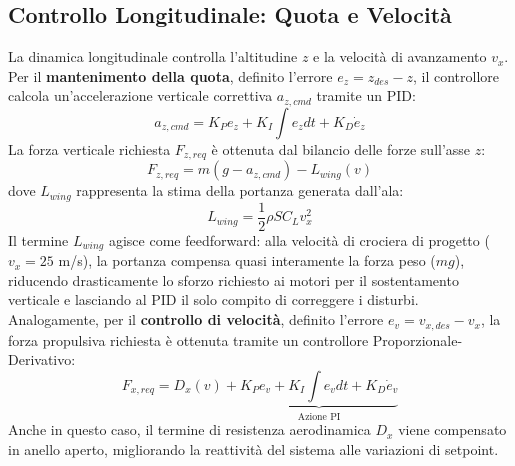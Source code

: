 \subsection{Controllo Longitudinale: Quota e Velocità}
La dinamica longitudinale controlla l'altitudine $z$ e la velocità di avanzamento $v_x$.
\\Per il \textbf{mantenimento della quota}, definito l'errore $e_z = z_{des} - z$, il controllore calcola un'accelerazione verticale correttiva $a_{z,cmd}$ tramite un PID:
\begin{equation}
        a_{z,cmd} = K_P e_z + K_I \int e_z dt + K_D \dot{e}_z
\end{equation} 
La forza verticale richiesta $F_{z,req}$ è ottenuta dal bilancio delle forze sull'asse $z$:
\begin{equation}
    F_{z,req} = m (g - a_{z,cmd}) - L_{wing}(v)
    \label{eq:fz_req}
\end{equation}
dove $L_{wing}$ rappresenta la stima della portanza generata dall'ala:
\begin{equation}
    L_{wing} = \frac{1}{2}\rho S C_L v_x^2
\end{equation}
Il termine $L_{wing}$ agisce come feedforward: alla velocità di crociera di progetto ($v_x = 25$ m/s), la portanza compensa quasi interamente la forza peso ($mg$), riducendo drasticamente lo sforzo richiesto ai motori per il sostentamento verticale e lasciando al PID il solo compito di correggere i disturbi.
\\Analogamente, per il \textbf{controllo di velocità}, definito l'errore $e_v = v_{x,des} - v_x$, la forza propulsiva richiesta è ottenuta tramite un controllore Proporzionale-Derivativo:
    \begin{equation}
        F_{x,req} = D_{x}(v) + \underbrace{K_P e_v + K_I \int e_v dt + K_D \dot{e}_v}_{\text{Azione PI}}
        \label{eq:fx}
    \end{equation}
Anche in questo caso, il termine di resistenza aerodinamica $D_{x}$ viene compensato in anello aperto, migliorando la reattività del sistema alle variazioni di setpoint.

